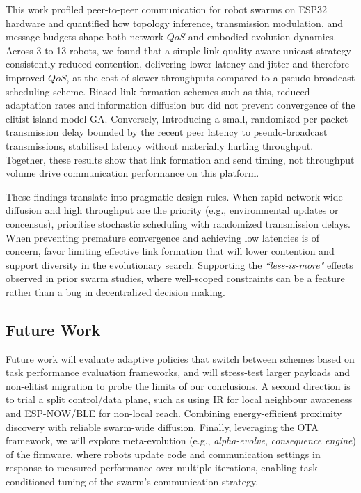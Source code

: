 \documentclass[conference]{IEEEtran}
\begin{document}
This work profiled peer-to-peer communication for robot swarms on ESP32 hardware and quantified how topology inference, transmission modulation, and message budgets shape both network $QoS$ and embodied evolution dynamics. Across 3 to 13 robots, we found that a simple link-quality aware unicast strategy consistently reduced contention, delivering lower latency and jitter and therefore improved $QoS$, at the cost of slower throughputs compared to a pseudo-broadcast scheduling scheme. Biased link formation schemes such as this, reduced adaptation rates and information diffusion but did not prevent convergence of the elitist island-model GA. Conversely, Introducing a small, randomized per-packet transmission delay bounded by the recent peer latency to pseudo-broadcast transmissions, stabilised latency without materially hurting throughput. Together, these results show that link formation and send timing, not throughput volume drive communication performance on this platform. 

These findings translate into pragmatic design rules. When rapid network-wide diffusion and high throughput are the priority (e.g., environmental updates or concensus), prioritise stochastic scheduling with randomized transmission delays. When preventing premature convergence and achieving low latencies is of concern, favor limiting effective link formation that will lower contention and support diversity in the evolutionary search. Supporting the \emph{“less-is-more"} effects observed in prior swarm studies, where well-scoped constraints can be a feature rather than a bug in decentralized decision making.


\subsection{Future Work}

Future work will evaluate adaptive policies that switch between schemes based on task performance evaluation frameworks, and will stress-test larger payloads and non-elitist migration to probe the limits of our conclusions. A second direction is to trial a split control/data plane, such as using IR for local neighbour awareness and ESP-NOW/BLE for non-local reach. Combining energy-efficient proximity discovery with reliable swarm-wide diffusion. Finally, leveraging the OTA framework, we will explore meta-evolution (e.g., \emph{alpha-evolve}, \emph{consequence engine}) of the firmware, where robots update code and communication settings in response to measured performance over multiple iterations, enabling task-conditioned tuning of the swarm's communication strategy.
\end{document}
